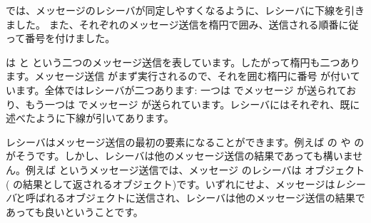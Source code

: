 \documentclass[a4paper,10pt,twoside]{book}
\begin{document}


 では、メッセージのレシーバが同定しやすくなるように、レシーバに下線を引きました。
また、それぞれのメッセージ送信を楕円で囲み、送信される順番に従って番号を付けました。


 は と  という二つのメッセージ送信を表しています。したがって楕円も二つあります。メッセージ送信  がまず実行されるので、それを囲む楕円に番号  が付いています。全体ではレシーバが二つあります: 一つは  でメッセージ  が送られており、もう一つは  でメッセージ  が送られています。レシーバにはそれぞれ、既に述べたように下線が引いてあります。

レシーバはメッセージ送信の最初の要素になることができます。例えば  の  や  の  がそうです。しかし、レシーバは他のメッセージ送信の結果であっても構いません。例えば  というメッセージ送信では、メッセージ  のレシーバは  オブジェクト ( の結果として返されるオブジェクト)です。いずれにせよ、メッセージは\emph{レシーバ}と呼ばれるオブジェクトに送信され、レシーバは他のメッセージ送信の結果であっても良いということです。
\end{document}
